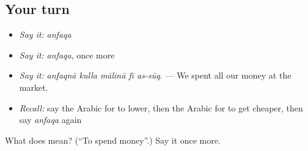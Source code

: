 \subsection*{Your turn}
\begin{itemize}
\raggedright
  \item \emph{Say it:} \emph{anfaqa}
  \item \emph{Say it:} \emph{anfaqa}, once more
  \item \emph{Say it:} \emph{anfaqnā kulla mālinā fī as-sūq.} — We spent all our money at the market.
  \item \emph{Recall:} say the Arabic for to lower, then the Arabic for to get cheaper, then say \emph{anfaqa} again
\end{itemize}

\begin{tcolorbox}[breakable,colback=teal!4,colframe=teal!35!black,title={Before you move on}]
What does  mean? (\textquotedblleft{}To spend money\textquotedblright{}.) Say it once more.
\end{tcolorbox}
